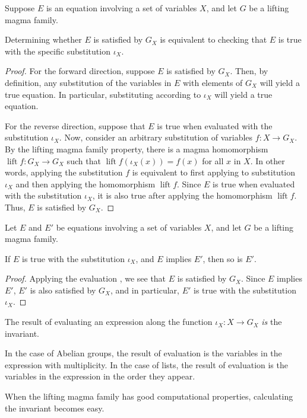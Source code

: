 \begin{theorem}\leanok\label{lifting-magma-basis-evaluation}
	Suppose $E$ is an equation involving a set of variables $X$, and let $G$ be a lifting magma family.

	Determining whether $E$ is satisfied by $G_X$ is equivalent to checking that $E$ is true with the specific substitution $\iota_X$.

\end{theorem}
\begin{proof}
	For the forward direction, suppose $E$ is satisfied by $G_X$. Then, by definition, any substitution of the variables in $E$ with elements of $G_X$ will yield a true equation. In particular, substituting according to $\iota_X$ will yield a true equation.

	For the reverse direction, suppose that $E$ is true when evaluated with the substitution $\iota_X$. Now, consider an arbitrary substitution of variables $f : X \to G_X$. By the lifting magma family property, there is a magma homomorphism $\operatorname{lift}{f} : G_X \to G_X$ such that $\operatorname{lift}{f}(\iota_X(x)) = f(x)$ for all $x$ in $X$. In other words, applying the substitution $f$ is equivalent to first applying to substitution $\iota_X$ and then applying the homomorphism $\operatorname{lift}{f}$. Since $E$ is true when evaluated with the substitution $\iota_X$, it is also true after applying the homomorphism $\operatorname{lift}{f}$. Thus, $E$ is satisfied by $G_X$.
\end{proof}

\begin{theorem}\label{fundamental-property-of-invariants}
	Let $E$ and $E'$ be equations involving a set of variables $X$, and let $G$ be a lifting magma family.

	If $E$ is true with the substitution $\iota_X$, and $E$ implies $E'$, then so is $E'$.
\end{theorem}
\begin{proof}
	Applying the evaluation , we see that $E$ is satisfied by $G_X$. Since $E$ implies $E'$, $E'$ is also satisfied by $G_X$, and in particular, $E'$ is true with the substitution $\iota_X$.
\end{proof}

\begin{remark}
	The result of evaluating an expression along the function $\iota_X : X \to G_X$ \emph{is} the invariant.

	In the case of Abelian groups, the result of evaluation is the variables in the expression with multiplicity.
	In the case of lists, the result of evaluation is the variables in the expression in the order they appear.

	When the lifting magma family has good computational properties, calculating the invariant becomes easy.
\end{remark}

